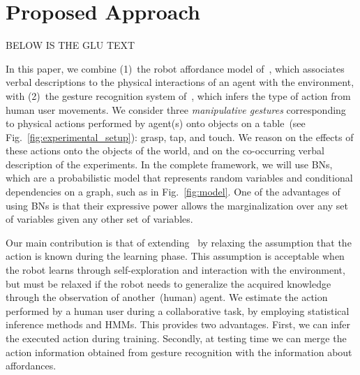 
\section{Proposed Approach}

BELOW IS THE GLU TEXT

In this paper, we combine (1)~the robot affordance model of~\cite{salvi:2012:smcb}, which associates verbal descriptions to the physical interactions of an agent with the environment, with (2)~the gesture recognition system of~\cite{saponaro:2013:crhri}, which infers the type of action from human user movements.
We consider three \emph{manipulative gestures} corresponding to physical actions performed by agent(s) onto objects on a table~(see Fig.~\ref{fig:experimental_setup}): grasp, tap, and touch.
We reason on the effects of these actions onto the objects of the world, and on the co-occurring verbal description of the experiments. In the complete framework, we will use \acfp{BN}, which are a probabilistic model that represents random variables and conditional dependencies on a graph, such as in Fig.~\ref{fig:model}. One of the advantages of using \acp{BN} is that their expressive power allows the marginalization over any set of variables given any other set of variables.

Our main contribution is that of extending~\cite{salvi:2012:smcb} by relaxing the assumption that the action is known during the learning phase.
This assumption is acceptable when the robot learns through self-exploration and interaction with the environment, but must be relaxed if the robot needs to generalize the acquired knowledge through the observation of another~(human) agent.
We estimate the action performed by a human user during a \hr{} collaborative task, by employing statistical inference methods and \acp{HMM}. This provides two advantages. First, we can infer the executed action during training. Secondly, at testing time we can merge the action information obtained from gesture recognition with the information about affordances.

